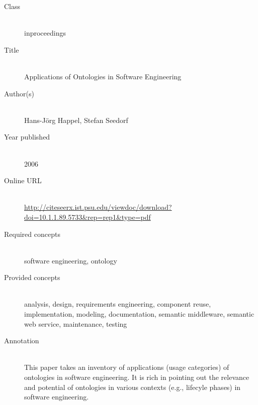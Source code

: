 \begin{description}
\item[Class]\mbox{}\\
inproceedings
\item[Title]\mbox{}\\
Applications of Ontologies in Software Engineering
\item[Author(s)]\mbox{}\\
Hans-J{\"o}rg Happel, Stefan Seedorf\item[Year published]\mbox{}\\
2006
\item[Online URL]\mbox{}\\
{\footnotesize\url{http://citeseerx.ist.psu.edu/viewdoc/download?doi=10.1.1.89.5733&rep=rep1&type=pdf}}
\item[Required concepts]\mbox{}\\
software engineering, ontology\item[Provided concepts]\mbox{}\\
analysis, design, requirements engineering, component reuse, implementation, modeling, documentation, semantic middleware, semantic web service, maintenance, testing\item[Annotation]\mbox{}\\
This paper takes an inventory of applications (usage categories) of ontologies in software engineering. It is rich in pointing out the relevance and potential of ontologies in various contexts (e.g., lifecyle phases) in software engineering.
\end{description}

